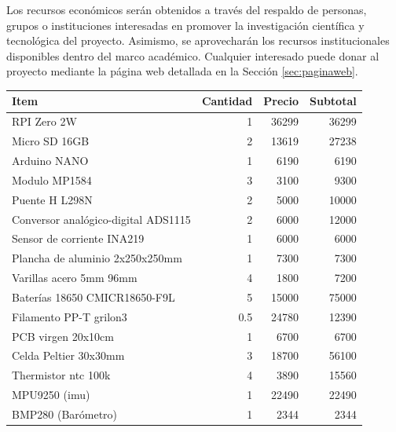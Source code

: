   Los recursos económicos serán obtenidos a través del respaldo de personas, grupos o instituciones interesadas en
  promover la investigación científica y tecnológica del proyecto. Asimismo, se aprovecharán los recursos
  institucionales disponibles dentro del marco académico. Cualquier interesado puede donar al proyecto mediante la
  página web detallada en la Sección \ref{sec:paginaweb}.

  \begin{table}[H]
    \centering
    \begin{tabular}{|l|r|r|r|}
      \hline
      \textbf{Item} & \textbf{Cantidad} & \textbf{Precio} & \textbf{Subtotal} \\
      \hline
      RPI Zero 2W                                     & 1     & 36299   & 36299 \\
      Micro SD 16GB                                   & 2     & 13619   & 27238 \\
      Arduino NANO                                    & 1     & 6190    & 6190  \\
      Modulo MP1584                                   & 3     & 3100    & 9300  \\
      Puente H L298N                                  & 2     & 5000    & 10000 \\
      Conversor analógico-digital ADS1115             & 2     & 6000    & 12000 \\
      Sensor de corriente INA219                      & 1     & 6000    & 6000  \\
      Plancha de aluminio 2x250x250mm                 & 1     & 7300    & 7300  \\
      Varillas acero 5mm 96mm                         & 4     & 1800    & 7200  \\
      Baterías 18650 CMICR18650-F9L                   & 5     & 15000   & 75000 \\
      Filamento PP-T grilon3                          & 0.5   & 24780   & 12390 \\
      PCB virgen 20x10cm                              & 1     & 6700    & 6700  \\
      Celda Peltier 30x30mm                           & 3     & 18700   & 56100 \\
      Thermistor ntc 100k                             & 4     & 3890    & 15560 \\
      MPU9250 (\acrshort{imu})                        & 1     & 22490   & 22490 \\
      BMP280 (Barómetro)                              & 1     & 2344    & 2344  \\

\end{tabular}
\end{table}
